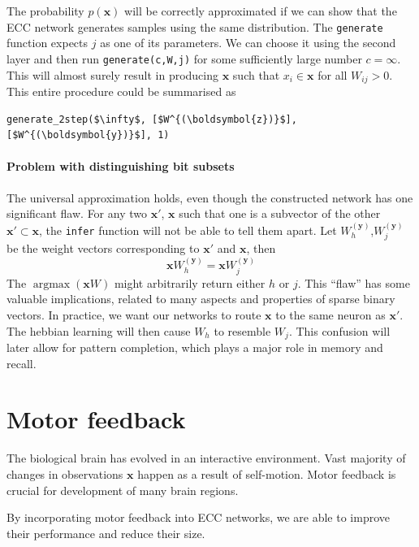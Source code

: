 \documentclass[12pt]{article}
\DeclareMathOperator*{\argmax}{argmax}
\begin{document}
The probability $p(\boldsymbol{x})$ will be correctly approximated if we can show that the ECC network generates samples using the same distribution. The \texttt{generate} function expects $j$ as one of its parameters. We can choose it using the second layer and then run \texttt{generate(c,W,j)} for some sufficiently large number $c=\infty$. This will almost surely result in producing  $\boldsymbol{x}$ such that $x_i\in \boldsymbol{x}$ for all $W_{ij}>0$. This entire procedure could be summarised as 
\begin{lstlisting}
generate_2step($\infty$, [$W^{(\boldsymbol{z})}$], [$W^{(\boldsymbol{y})}$], 1)
\end{lstlisting}

\paragraph{Problem with distinguishing bit subsets} The universal approximation holds, even though the constructed network has one significant flaw. For any two $\boldsymbol{x}'$, $\boldsymbol{x}$ such that one is a subvector of the other $\boldsymbol{x}'\subset \boldsymbol{x}$, the \texttt{infer} function will not be able to tell them apart. Let $W_h^{(\boldsymbol{y})}$,$W_j^{(\boldsymbol{y})}$ be the weight vectors corresponding to $\boldsymbol{x}'$ and $\boldsymbol{x}$, then
\[\boldsymbol{x}W_h^{(\boldsymbol{y})}=\boldsymbol{x}W_j^{(\boldsymbol{y})}
\] 
The $\argmax(\boldsymbol{x}W)$ might arbitrarily return either $h$ or $j$. This ``flaw'' has some valuable implications, related to many aspects and properties of sparse binary vectors. In practice, we want our networks to route $\boldsymbol{x}$ to the same neuron as $\boldsymbol{x}'$.  The hebbian learning will then cause $W_h$ to resemble $W_j$. This confusion will later allow for pattern completion, which plays a major role in memory and recall. 


\section{Motor feedback}

The biological brain has evolved in an interactive environment. Vast majority of changes in observations $\boldsymbol{x}$ happen as a result of self-motion. Motor feedback is crucial for development of many brain regions.

By incorporating motor feedback into ECC networks, we are able to improve their performance and reduce their size.
\end{document}
